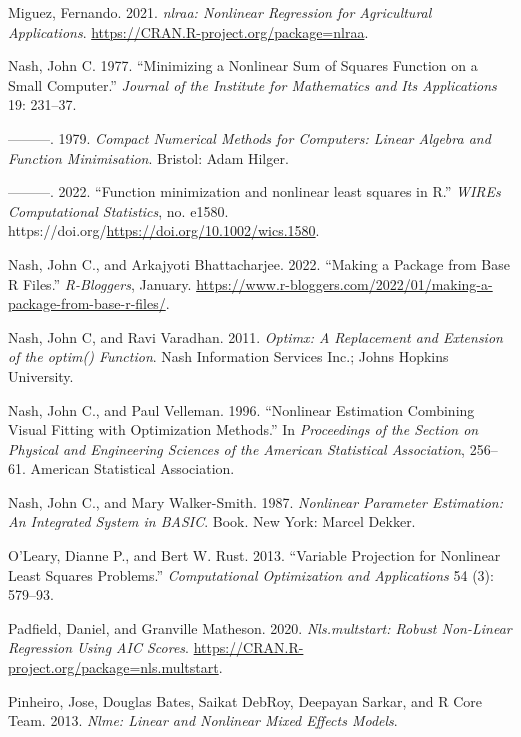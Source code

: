 \begin{CSLReferences}
Miguez, Fernando. 2021. \emph{{nlraa: Nonlinear Regression for Agricultural Applications}}. \url{https://CRAN.R-project.org/package=nlraa}.

Nash, John C. 1977. {``Minimizing a Nonlinear Sum of Squares Function on a Small Computer.''} \emph{Journal of the Institute for Mathematics and Its Applications} 19: 231--37.

---------. 1979. \emph{Compact Numerical Methods for Computers: Linear Algebra and Function Minimisation}. Bristol: Adam Hilger.

---------. 2022. {``{Function minimization and nonlinear least squares in R}.''} \emph{WIREs Computational Statistics}, no. e1580. https://doi.org/\url{https://doi.org/10.1002/wics.1580}.

Nash, John C., and Arkajyoti Bhattacharjee. 2022. {``Making a Package from Base {R} Files.''} \emph{R-Bloggers}, January. \url{https://www.r-bloggers.com/2022/01/making-a-package-from-base-r-files/}.

Nash, John C, and Ravi Varadhan. 2011. \emph{\emph{Optimx}: A Replacement and Extension of the {optim()} Function}. Nash Information Services Inc.; Johns Hopkins University.

Nash, John C., and Paul Velleman. 1996. {``Nonlinear Estimation Combining Visual Fitting with Optimization Methods.''} In \emph{Proceedings of the Section on Physical and Engineering Sciences of the American Statistical Association}, 256--61. American Statistical Association.

Nash, John C., and Mary Walker-Smith. 1987. \emph{Nonlinear Parameter Estimation: An Integrated System in BASIC}. Book. New York: Marcel Dekker.

O'Leary, Dianne P., and Bert W. Rust. 2013. {``Variable Projection for Nonlinear Least Squares Problems.''} \emph{Computational Optimization and Applications} 54 (3): 579--93.

Padfield, Daniel, and Granville Matheson. 2020. \emph{Nls.multstart: Robust Non-Linear Regression Using AIC Scores}. \url{https://CRAN.R-project.org/package=nls.multstart}.

Pinheiro, Jose, Douglas Bates, Saikat DebRoy, Deepayan Sarkar, and R Core Team. 2013. \emph{Nlme: Linear and Nonlinear Mixed Effects Models}.


\end{CSLReferences}
